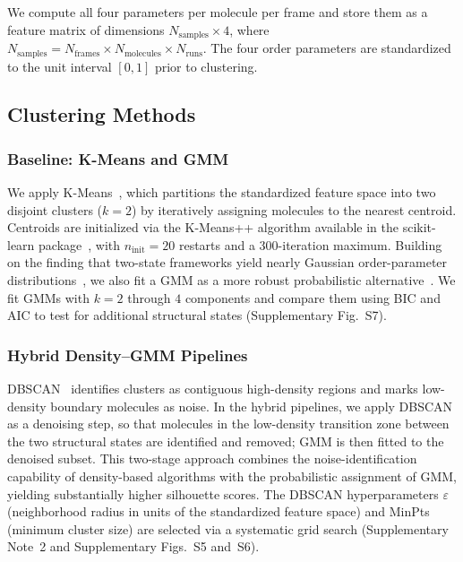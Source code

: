 \documentclass[aps, amsmath,amssymb, reprint, twocolumn, superscriptaddress]{revtex4-2}
\begin{document}
We compute all four parameters per molecule per frame and store them as a feature matrix of dimensions $N_{\text{samples}} \times 4$, where $N_{\text{samples}} = N_{\text{frames}} \times N_{\text{molecules}} \times N_{\text{runs}}$. The four order parameters are standardized to the unit interval $[0,1]$ prior to clustering.

\subsection{Clustering Methods}
\label{sec:clustering_algorithm}

\subsubsection{Baseline: K-Means and GMM}
We apply K-Means~\cite{ikotun_k-means_2023}, which partitions the standardized feature space into two disjoint clusters ($k=2$) by iteratively assigning molecules to the nearest centroid. Centroids are initialized via the K-Means++ algorithm available in the scikit-learn package~\cite{scikit-learn}, with $n_{\text{init}} = 20$ restarts and a 300-iteration maximum. Building on the finding that two-state frameworks yield nearly Gaussian order-parameter distributions~\cite{shi_direct_2020}, we also fit a GMM as a more robust probabilistic alternative~\cite{deprez-2024}. We fit GMMs with $k = 2$ through $4$ components and compare them using BIC and AIC to test for additional structural states (Supplementary Fig.~S7).

\subsubsection{Hybrid Density--GMM Pipelines}
DBSCAN~\cite{ester_density-based_1996} identifies clusters as contiguous high-density regions and marks low-density boundary molecules as noise. In the hybrid pipelines, we apply DBSCAN as a denoising step, so that molecules in the low-density transition zone between the two structural states are identified and removed; GMM is then fitted to the denoised subset. This two-stage approach combines the noise-identification capability of density-based algorithms with the probabilistic assignment of GMM, yielding substantially higher silhouette scores. The DBSCAN hyperparameters $\varepsilon$ (neighborhood radius in units of the standardized feature space) and MinPts (minimum cluster size) are selected via a systematic grid search (Supplementary Note~2 and Supplementary Figs.~S5 and~S6).
\end{document}
